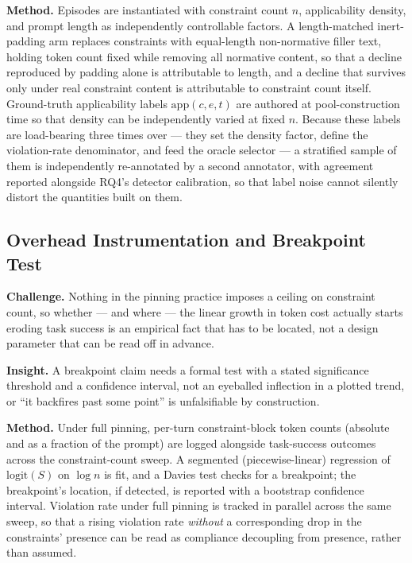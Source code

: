 \documentclass[11pt]{article}
\begin{document}
\textbf{Method.} Episodes are instantiated with constraint count $n$, applicability density, and prompt length as independently controllable factors. A length-matched inert-padding arm replaces constraints with equal-length non-normative filler text, holding token count fixed while removing all normative content, so that a decline reproduced by padding alone is attributable to length, and a decline that survives only under real constraint content is attributable to constraint count itself. Ground-truth applicability labels $\mathrm{app}(c,e,t)$ are authored at pool-construction time so that density can be independently varied at fixed $n$. Because these labels are load-bearing three times over --- they set the density factor, define the violation-rate denominator, and feed the oracle selector --- a stratified sample of them is independently re-annotated by a second annotator, with agreement reported alongside RQ4's detector calibration, so that label noise cannot silently distort the quantities built on them.

\subsection{Overhead Instrumentation and Breakpoint Test}
\textbf{Challenge.} Nothing in the pinning practice imposes a ceiling on constraint count, so whether --- and where --- the linear growth in token cost actually starts eroding task success is an empirical fact that has to be located, not a design parameter that can be read off in advance.

\textbf{Insight.} A breakpoint claim needs a formal test with a stated significance threshold and a confidence interval, not an eyeballed inflection in a plotted trend, or ``it backfires past some point'' is unfalsifiable by construction.

\textbf{Method.} Under full pinning, per-turn constraint-block token counts (absolute and as a fraction of the prompt) are logged alongside task-success outcomes across the constraint-count sweep. A segmented (piecewise-linear) regression of $\mathrm{logit}(S)$ on $\log n$ is fit, and a Davies test checks for a breakpoint; the breakpoint's location, if detected, is reported with a bootstrap confidence interval. Violation rate under full pinning is tracked in parallel across the same sweep, so that a rising violation rate \emph{without} a corresponding drop in the constraints' presence can be read as compliance decoupling from presence, rather than assumed.
\end{document}
